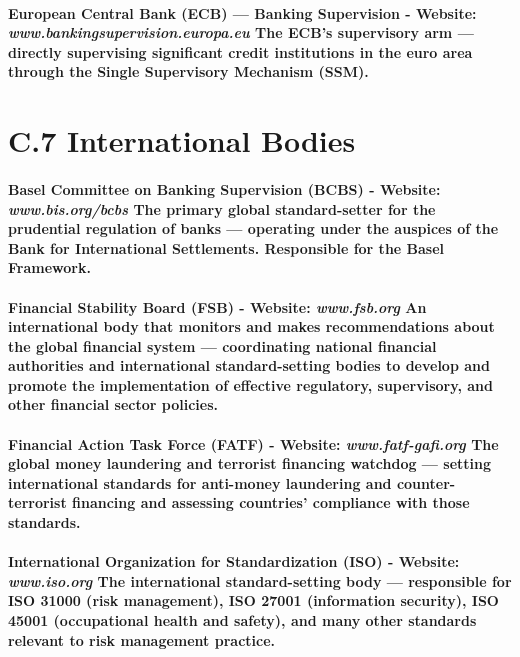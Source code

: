 \paragraph{\textbf{European Central Bank (ECB) — Banking Supervision} - Website: \textit{www.bankingsupervision.europa.eu} The ECB's supervisory arm — directly supervising significant credit institutions in the euro area through the Single Supervisory Mechanism (SSM).}

\section*{C.7 International Bodies}
\paragraph{\textbf{Basel Committee on Banking Supervision (BCBS)} - Website: \textit{www.bis.org/bcbs} The primary global standard-setter for the prudential regulation of banks — operating under the auspices of the Bank for International Settlements. Responsible for the Basel Framework.}
\paragraph{\textbf{Financial Stability Board (FSB)} - Website: \textit{www.fsb.org} An international body that monitors and makes recommendations about the global financial system — coordinating national financial authorities and international standard-setting bodies to develop and promote the implementation of effective regulatory, supervisory, and other financial sector policies.}
\paragraph{\textbf{Financial Action Task Force (FATF)} - Website: \textit{www.fatf-gafi.org} The global money laundering and terrorist financing watchdog — setting international standards for anti-money laundering and counter-terrorist financing and assessing countries' compliance with those standards.}
\paragraph{\textbf{International Organization for Standardization (ISO)} - Website: \textit{www.iso.org} The international standard-setting body — responsible for ISO 31000 (risk management), ISO 27001 (information security), ISO 45001 (occupational health and safety), and many other standards relevant to risk management practice.}
